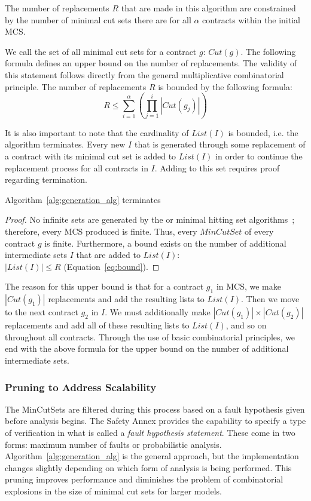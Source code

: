 The number of replacements $R$ that are made in this algorithm are constrained by the number of minimal cut sets there are 
for all $\alpha$ contracts within the initial MCS. 

We call the set of all minimal cut sets for a contract $g$: $Cut(g)$. The following formula defines an upper bound on the number of replacements. The validity of this statement follows directly from the general multiplicative combinatorial principle. The number of replacements $R$ is bounded by the following formula:
\begin{equation}
\label{eq:bound}
  R \leq {\displaystyle \sum_{i=1}^{\alpha} }({\displaystyle \prod_{j=1}^{i} |Cut(g_j)|})  
\end{equation}


It is also important to note that the cardinality of $List(I)$ is bounded, i.e. the algorithm terminates. Every new $I$ that is generated through some replacement of a contract with its minimal cut set is added to $List(I)$ in order to continue the replacement process for all contracts in $I$. Adding to this set requires proof regarding termination.
\begin{theorem}
Algorithm~\ref{alg:generation_alg} terminates
\begin{proof}
No infinite sets are generated by the \aivcalg or minimal hitting set algorithms~\cite{Ghassabani2017EfficientGO,murakami2013efficient}; therefore, every MCS produced is finite. Thus, every $MinCutSet$ of every contract $g$ is finite. Furthermore, a bound exists on the number of additional intermediate sets $I$ that are added to $List(I)$: \\
$|List(I)| \leq R$ (Equation~\ref{eq:bound}).
\end{proof}
\end{theorem}

The reason for this upper bound is that for a contract $g_1$ in MCS, we make $|Cut(g_1)|$ replacements and add the resulting lists to $List(I)$. Then we move to the next contract $g_2$ in $I$. We must additionally make $|Cut(g_1)| \times |Cut(g_2)|$ replacements and add all of these resulting lists to $List(I)$, and so on throughout all contracts. Through the use of basic combinatorial principles, we end with the above formula for the upper bound on the number of additional intermediate sets.


\subsubsection{Pruning to Address Scalability}
The MinCutSets are filtered during this process based on a fault hypothesis given before analysis begins. The Safety Annex provides the capability to specify a type of verification in what is called a \textit{fault hypothesis statement}. These come in two forms: maximum number of faults or probabilistic analysis. Algorithm~\ref{alg:generation_alg} is the general approach, but the implementation changes slightly depending on which form of analysis is being performed. This pruning improves performance and diminishes the problem of combinatorial explosions in the size of minimal cut sets for larger models. \\

